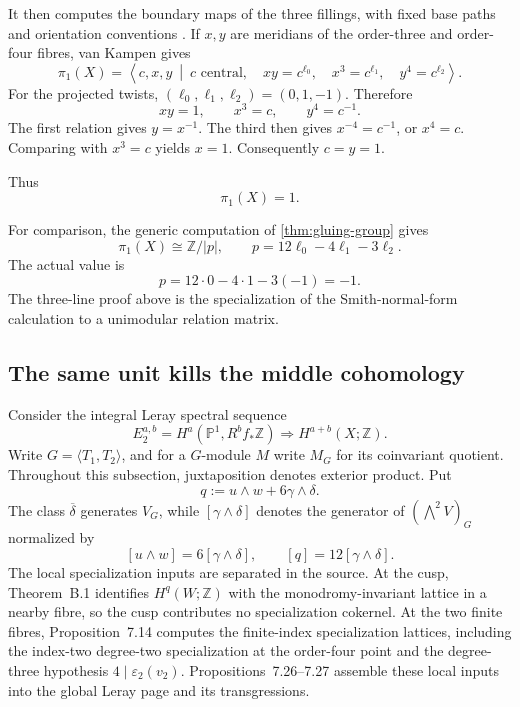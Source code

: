 \documentclass[11pt,reqno]{amsart}
\numberwithin{equation}{section}
\newcommand{\Z}{\mathbb Z}
\newcommand{\Pone}{\mathbb P^1}
\theoremstyle{definition}
\begin{document}
It then computes the boundary maps of the three fillings, with fixed base paths and orientation conventions \cite[Lem.~7.4, Lem.~7.16, Thm.~7.17]{S6}. If $x,y$ are meridians of the order-three and order-four fibres, van Kampen gives
\begin{equation}\label{eq:presentation}
\pi_1(X)=
\left\langle c,x,y\ \middle|\
 c\text{ central},\quad
 xy=c^{\ell_0},\quad
 x^3=c^{\ell_1},\quad
 y^4=c^{\ell_2}
\right\rangle.
\end{equation}
For the projected twists, $(\ell_0,\ell_1,\ell_2)=(0,1,-1)$. Therefore
\[
xy=1,
\qquad x^3=c,
\qquad y^4=c^{-1}.
\]
The first relation gives $y=x^{-1}$. The third then gives $x^{-4}=c^{-1}$, or $x^4=c$. Comparing with $x^3=c$ yields $x=1$. Consequently $c=y=1$.

Thus
\begin{equation}\label{eq:pi1trivial}
\pi_1(X)=1.
\end{equation}

For comparison, the generic computation of \cref{thm:gluing-group} gives
\[
\pi_1(X)\cong\Z/|p|,
\qquad
p=12\ell_0-4\ell_1-3\ell_2.
\]
The actual value is
\begin{equation}\label{eq:pminusone}
p=12\cdot0-4\cdot1-3(-1)=-1.
\end{equation}
The three-line proof above is the specialization of the Smith-normal-form calculation to a unimodular relation matrix.

\subsection{The same unit kills the middle cohomology}\label{sec:cohomology}

Consider the integral Leray spectral sequence
\[
E_2^{a,b}=H^a(\Pone,R^bf_*\Z)\Longrightarrow H^{a+b}(X;\Z).
\]
Write $G=\langle T_1,T_2\rangle$, and for a $G$-module $M$ write $M_G$ for its coinvariant quotient. Throughout this subsection, juxtaposition denotes exterior product. Put
\[
q:=u\wedge w+6\gamma\wedge\delta.
\]
The class $\overline\delta$ generates $V_G$, while $[\gamma\wedge\delta]$ denotes the generator of $(\bigwedge^2V)_G$ normalized by
\[
[u\wedge w]=6[\gamma\wedge\delta],
\qquad
[q]=12[\gamma\wedge\delta].
\]
The local specialization inputs are separated in the source. At the cusp, Theorem~B.1 identifies $H^q(W;\Z)$ with the monodromy-invariant lattice in a nearby fibre, so the cusp contributes no specialization cokernel. At the two finite fibres, Proposition~7.14 computes the finite-index specialization lattices, including the index-two degree-two specialization at the order-four point and the degree-three hypothesis $4\mid\varepsilon_2(v_2)$. Propositions~7.26--7.27 assemble these local inputs into the global Leray page and its transgressions.
\end{document}
